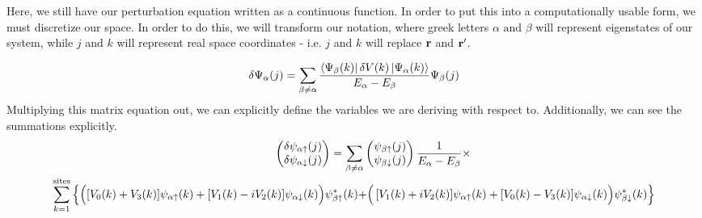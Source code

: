 \documentclass[10pt]{revtex4-1}
\newcommand{\bfr}{{\bf r}}
\newcommand{\ua}{\uparrow}
\newcommand{\da}{\downarrow}
\begin{document}
Here, we still have our perturbation equation written as a continuous function.
In order to put this into a computationally usable form, we must discretize our space.
In order to do this, we will transform our notation, where greek letters $\alpha \text{ and } \beta$ will represent eigenstates of our system, while $j$ and $k$ will represent real space coordinates - i.e. $j$ and $k$ will replace $\bfr$ and $\bfr'$.

\begin{equation}
  \delta \Psi_{\alpha}(j) \\
  = \sum_{\beta \neq \alpha} \frac{\bra{\Psi_{\beta}(k)} \delta V(k) \ket{\Psi_{\alpha}(k)}}
  {E_{\alpha} - E_{\beta}}
  \Psi_{\beta}(j)
\end{equation}
Multiplying this matrix equation out, we can explicitly define the variables we are deriving with respect to.
Additionally, we can see the summations explicitly.
\begin{multline}
  \hspace{1.2cm}
  \begin{pmatrix}
    \delta \psi_{\alpha \ua}(j) \\
    \delta \psi_{\alpha \da}(j) \\
  \end{pmatrix}
  = \sum_{\beta \neq \alpha}
  \begin{pmatrix}
    \psi_{\beta \ua}(j) \\
    \psi_{\beta \da}(j) \\
  \end{pmatrix}
  \frac{1}{E_{\alpha} - E_{\beta}} \times \\
  \sum_{k=1}^{\text{sites}} \left\{ \left([V_0(k) + V_3(k)]\psi_{\alpha \ua}(k) + [V_1(k) - i V_2(k)]\psi_{\alpha \da}(k)\Big{)}\psi_{\beta \ua}^*(k) +  \right([V_1(k) + i V_2(k)]\psi_{\alpha \ua}(k) + [V_0(k) -  V_3(k)]\psi_{\alpha \da}(k)\Big{)} \psi_{\beta \da}^*(k) \right \}
\end{multline}
\end{document}
